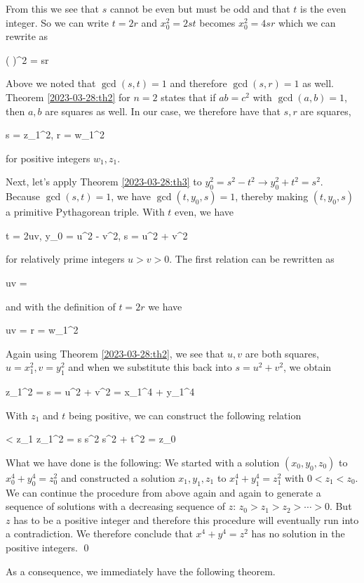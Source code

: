 From this we see that $s$ cannot be even but must be odd and that $t$ is the even integer. So we can write $t = 2r$ and $x_0^2 = 2st$ becomes $x_0^2 = 4sr$ which we can rewrite as

\bee
\left(  \right)^2 = sr
\eee

Above we noted that $\gcd(s, t) = 1$ and therefore $\gcd(s, r) = 1$ as well. Theorem \ref{2023-03-28:th2} for $n=2$ states that if $ab=c^2$ with $\gcd(a,b)=1$, then $a, b$ are squares as well. In our case, we therefore have that $s, r$ are squares,

\bee
s = z_1^2, \quad r = w_1^2
\eee

for positive integers $w_1, z_1$.

Next, let's apply Theorem \ref{2023-03-28:th3} to $y_0^2 = s^2 - t^2 \rightarrow y_0^2 + t^2 = s^2$. Because $\gcd(s,t) = 1$, we have $\gcd(t, y_0, s) = 1$, thereby making $(t, y_0, s)$ a primitive Pythagorean triple. With $t$ even, we have

\bee
t = 2uv, \quad y_0 = u^2 - v^2, \quad s = u^2 + v^2
\eee

for relatively prime integers $u > v > 0$. The first relation can be rewritten as

\bee
uv = 
\eee

and with the definition of $t = 2r$ we have 

\bee
uv = r = w_1^2
\eee

Again using Theorem \ref{2023-03-28:th2}, we see that $u, v$ are both squares, $u=x_1^2, v = y_1^2$ and when we substitute this back into $s = u^2 + v^2$, we obtain

\bee
z_1^2 = s = u^2 + v^2 = x_1^4 + y_1^4
\eee

With $z_1$ and $t$ being positive, we can construct the following relation

 < z_1 \leq z_1^2  = s \leq s^2 \leq s^2 + t^2 = z_0
\eee

What we have done is the following: We started with a solution $(x_0, y_0, z_0)$ to $x_0^4 + y_0^4 = z_0^2$ and constructed a solution $x_1, y_1, z_1$ to $x_1^4 + y_1^4 = z_1^2$ with $0 < z_1 < z_0$. We can continue the procedure from above again and again to generate a sequence of solutions with a decreasing sequence of $z$: $z_0 > z_1 > z_2 > \cdots > 0$. But $z$ has to be a positive integer and therefore this procedure will eventually run into a contradiction. We therefore conclude that $x^4 + y^4 = z^2$ has no solution in the positive integers. \qed

As a consequence, we immediately have the following theorem.

